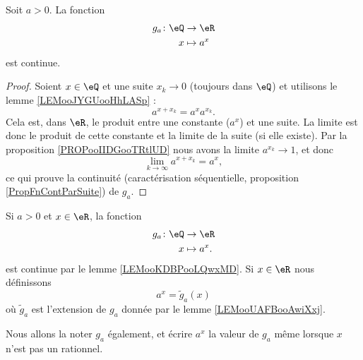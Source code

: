 \begin{lemma}       \label{LEMooKDBPooLQwxMD}
    Soit \( a>0\). La fonction
    \begin{equation}
        \begin{aligned}
            g_a\colon \eQ&\to \eR \\
            x&\mapsto a^x 
        \end{aligned}
    \end{equation}
    est continue.
\end{lemma}

\begin{proof}
    Soient \( x\in \eQ\) et une suite \( x_k\to 0\) (toujours dans \( \eQ\)) et utilisons le lemme \ref{LEMooJYGUooHhLASp} :
    \begin{equation}
        a^{x+x_k}=a^xa^{x_k}.
    \end{equation}
    Cela est, dans \( \eR\), le produit entre une constante (\( a^x\)) et une suite. La limite est donc le produit de cette constante et la limite de la suite (si elle existe). Par la proposition \ref{PROPooIIDGooTRtlUD} nous avons la limite \( a^{x_k}\to 1\), et donc
    \begin{equation}
        \lim_{k\to \infty} a^{x+x_k}=a^x,
    \end{equation}
    ce qui prouve la continuité (caractérisation séquentielle, proposition \ref{PropFnContParSuite}) de \( g_a\).
\end{proof}

\begin{definition}  \label{DEFooOJMKooJgcCtq}
    Si \( a>0\) et \( x\in \eR\), la fonction
    \begin{equation}
        \begin{aligned}
            g_a\colon \eQ&\to \eR \\
            x&\mapsto a^x. 
        \end{aligned}
    \end{equation}
    est continue par le lemme \ref{LEMooKDBPooLQwxMD}. Si \( x\in \eR\) nous définissons
    \begin{equation}
        a^x=\tilde g_a(x)
    \end{equation}
    où \( \tilde g_a\) est l'extension de \( g_a\) donnée par le lemme \ref{LEMooUAFBooAwiXxj}.

    Nous allons la noter \( g_a\) également, et écrire \( a^x\) la valeur de \( g_a\) même lorsque \( x\) n'est pas un rationnel.
\end{definition}


